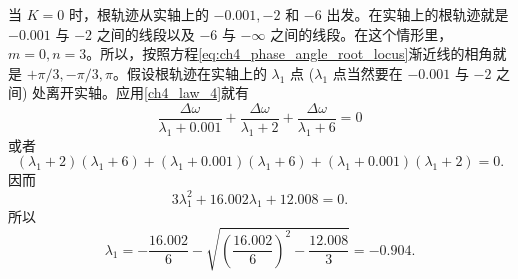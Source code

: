 当 $K=0$ 时，根轨迹从实轴上的 $-0.001, -2$ 和 $-6$ 出发。在实轴上的根轨迹就是 $-0.001$ 与 $-2$ 之间的线段以及 $-6$ 与 $-\infty$ 之间的线段。在这个情形里， $m=0, n=3$。所以，按照方程\eqref{eq:ch4_phase_angle_root_locus}渐近线的相角就是 $+\pi/3, -\pi/3, \pi$。假设根轨迹在实轴上的 $\lambda_1$ 点 ($\lambda_1$ 点当然要在 $-0.001$ 与 $-2$ 之间) 处离开实轴。应用\ref{ch4_law_4}就有
\begin{equation*}
\frac{\Delta \omega}{\lambda_1 + 0.001} + \frac{\Delta \omega}{\lambda_1 + 2} + \frac{\Delta \omega}{\lambda_1 + 6} = 0
\end{equation*}
或者
\begin{equation*}
(\lambda_1 + 2)(\lambda_1 + 6) + (\lambda_1 + 0.001)(\lambda_1 + 6) + (\lambda_1 + 0.001)(\lambda_1 + 2) = 0.
\end{equation*}
因而
\begin{equation*}
3\lambda_1^2 + 16.002\lambda_1 + 12.008 = 0.
\end{equation*}
所以
\begin{equation*}
\lambda_1 = -\frac{16.002}{6} - \sqrt{\left(\frac{16.002}{6}\right)^2 - \frac{12.008}{3}} = -0.904.
\end{equation*}

